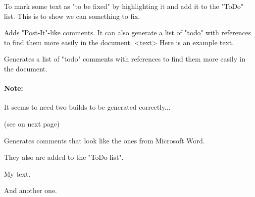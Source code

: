 {
    To mark some text as "to be fixed" by highlighting it and add it to the
    "ToDo" list.
}
{
}
{
    This is to show we can 
    something to fix.
}



{
    Adds "Post-It"-like comments. It can also generate a list of "todo" with
    references to find them more easily in the document.
}
{
    <text>
}
{
    Here is an example text.
}



{
    Generates a list of "todo" comments with references to find them more easily
    in the document.
    \paragraph{Note:} It seems to need two builds to be generated correctly...
}
{
    \listoftodos
}
{
    (see on next page)
    \listoftodos
}



{
    Generates comments that look like the ones from Microsoft Word.

    They also are added to the "ToDo list".
}
{
}
{
    My  text.

    And  another one.
}
